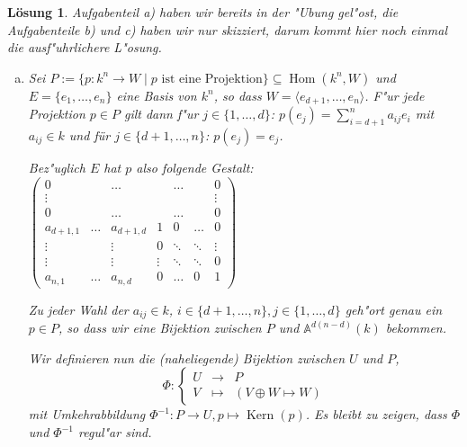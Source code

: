\documentclass[a4paper, 12pt, numbers=noendperiod, chapterprefix=true]{scrbook}
\theoremstyle{break}
\newtheorem{Loes}{L\"osung}
\theoremstyle{nonumberbreak}
\theoremstyle{nonumberplain}
\DeclareMathOperator{\Hom}{Hom}
\DeclareMathOperator{\Kern}{Kern}
\newcommand{\A}{\mathbb{A}}
\newcommand{\Affine}{\mathbb{A}} %
\begin{document}
\begin{Loes}
Aufgabenteil a) haben wir bereits in der "Ubung gel"ost, die Aufgabenteile b) und c) haben wir nur skizziert, darum kommt hier noch einmal die ausf"uhrlichere L"osung.
\begin{enumerate}[a)]
\item[b)]
	Sei $P:= \{ p:k^n \to W \mid p \textrm{ ist eine Projektion} \} \subseteq \Hom(k^n, W)$ und $E = \{ e_1, \dots, e_n\}$ eine Basis von $k^n$, so dass $W = \langle e_{d+1},\dots, e_n\rangle$. F"ur jede Projektion $p \in P$ gilt dann f"ur $j \in\{ 1,\dots, d\}$: $p(e_j) = \sum_{i = d+1}^n a_{ij} e_i$ mit $a_{ij}\in k$ und für $j \in \{d+1, \dots, n\}$: $p(e_j) = e_j$. 
 
	Bez"uglich $E$ hat $p$ also folgende Gestalt:
		$\begin{pmatrix}
		0& &\dots && \dots && 0 \\
		\vdots &&&&&& \vdots \\
		0 && \dots && \dots && 0 \\
		a_{d+1,1} & \dots & a_{d+1,d} & 1 & 0 &\dots &0\\
		\vdots & & \vdots & 0 &\ddots& \ddots & \vdots\\
		\vdots & & \vdots & \vdots & \ddots&\ddots&0 \\
		a_{n,1} & \dots & a_{n,d} & 0 &\dots &0& 1
		\end{pmatrix}$

	Zu jeder Wahl der $a_{ij} \in k$, $i \in \{d+1,\dots, n\}, j \in\{1, \dots, d\}$ geh"ort genau ein $p \in P$, so dass wir eine Bijektion zwischen $P$ und $\Affine^{d(n-d)}(k)$ bekommen.

	Wir definieren nun die (naheliegende) Bijektion zwischen $U$ und $P$, 
		\[\Phi \colon \left \{ \begin{array}{rcl}
                    U & \to & P \\
                    V & \mapsto & (V \oplus W \mapsto W)
                   \end{array} \right .\]
	mit Umkehrabbildung $\Phi^{-1}\colon P \to U ,  p \mapsto \Kern(p)$. Es bleibt zu zeigen, dass $\Phi$ und $\Phi^{-1}$ regul"ar sind.
 

\end{enumerate}
\end{Loes}
\end{document}
